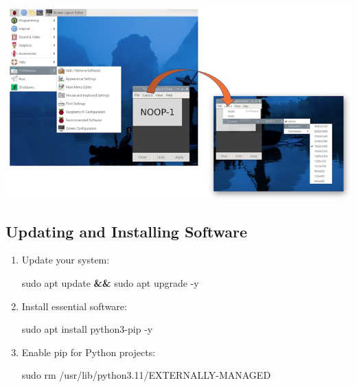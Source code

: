 \documentclass[
]{article}
\newenvironment{Shaded}{\begin{snugshade}}{\end{snugshade}}
\newcommand{\AttributeTok}[1]{\textcolor[rgb]{0.40,0.45,0.13}{#1}}
\newcommand{\FunctionTok}[1]{\textcolor[rgb]{0.28,0.35,0.67}{#1}}
\newcommand{\KeywordTok}[1]{\textcolor[rgb]{0.00,0.23,0.31}{\textbf{#1}}}
\newcommand{\NormalTok}[1]{\textcolor[rgb]{0.00,0.23,0.31}{#1}}
\begin{document}
\noindent \begin{center}
\includegraphics[width=0.9\linewidth,height=\textheight,keepaspectratio]{images/png/vnc-9.png}
\end{center}

\subsection{Updating and Installing
Software}\label{sec-setup-updating-installing-software-b85d}

\begin{enumerate}
\def\labelenumi{\arabic{enumi}.}
\item
  Update your system:

\begin{Shaded}
\begin{Highlighting}[]
\FunctionTok{sudo}\NormalTok{ apt update }\KeywordTok{\&\&} \FunctionTok{sudo}\NormalTok{ apt upgrade }\AttributeTok{{-}y}
\end{Highlighting}
\end{Shaded}
\item
  Install essential software:

\begin{Shaded}
\begin{Highlighting}[]
\FunctionTok{sudo}\NormalTok{ apt install python3{-}pip }\AttributeTok{{-}y}
\end{Highlighting}
\end{Shaded}
\item
  Enable pip for Python projects:

\begin{Shaded}
\begin{Highlighting}[]
\FunctionTok{sudo}\NormalTok{ rm /usr/lib/python3.11/EXTERNALLY{-}MANAGED}
\end{Highlighting}
\end{Shaded}
\end{enumerate}
\end{document}
